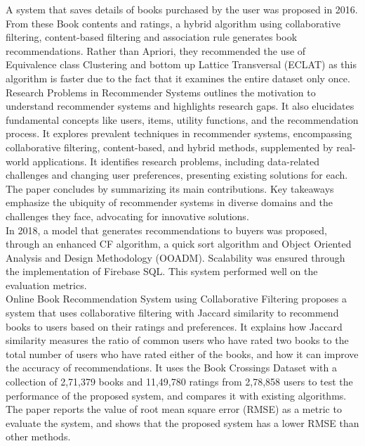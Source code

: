  A system that saves details of books purchased by
the user \cite{inproceedings} was proposed in 2016. From these Book contents and ratings, a hybrid algorithm using collaborative
filtering, content-based filtering and association rule generates book recommendations.
Rather than Apriori, they recommended the use of Equivalence class Clustering and
bottom up Lattice Transversal (ECLAT) as this algorithm is faster due to the fact that it examines the entire dataset only once.
\\
Research Problems in Recommender Systems\cite{article3} outlines the motivation to understand recommender systems and highlights research gaps. It also elucidates fundamental concepts like users, items, utility functions, and the recommendation process. It explores prevalent techniques in recommender systems, encompassing collaborative filtering, content-based, and hybrid methods, supplemented by real-world applications. It identifies research problems, including data-related challenges and changing user preferences, presenting existing solutions for each. The paper concludes by summarizing its main contributions. Key takeaways emphasize the ubiquity of recommender systems in diverse domains and the challenges they face, advocating for innovative solutions.
\\
In 2018, a model that generates recommendations to buyers\cite{okon} was proposed,
through an enhanced CF algorithm, a quick sort algorithm and Object Oriented Analysis
and Design Methodology (OOADM). Scalability was ensured through the implementation
of Firebase SQL. This system performed well on the evaluation metrics.
\\ 
Online Book Recommendation System using Collaborative Filtering \cite{JS} proposes a system that uses collaborative filtering with Jaccard similarity to recommend books to users based on their ratings and preferences. It explains how Jaccard similarity measures the ratio of common users who have rated two books to the total number of users who have rated either of the books, and how it can improve the accuracy of recommendations. It uses the Book Crossings Dataset with a collection of 2,71,379 books and 11,49,780 ratings from 2,78,858 users to test the performance of the proposed system, and compares it with existing algorithms. The paper reports the value of root mean square error (RMSE) as a metric to evaluate the system, and shows that the proposed system has a lower RMSE than other methods.\\
